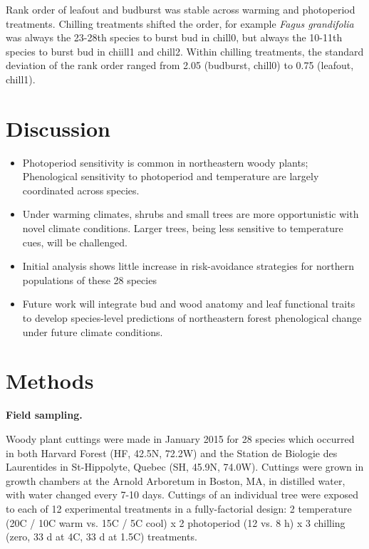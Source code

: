 \documentclass{article}
\begin{document}
Rank order of leafout and budburst was stable across warming and photoperiod treatments. Chilling treatments shifted the order, for example \emph{Fagus grandifolia} was always the 23-28th species to burst bud in chill0, but always the 10-11th species to burst bud in chiill1 and chill2. Within chilling treatments, the standard deviation of the rank order ranged from 2.05 (budburst, chill0) to 0.75 (leafout, chill1). 

\section*{Discussion}

\begin{itemize}

\item{Photoperiod sensitivity is common in northeastern woody plants; Phenological sensitivity to photoperiod and temperature are largely coordinated across species.}
\item{Under warming climates, shrubs and small trees are more opportunistic with novel climate conditions. Larger trees, being less sensitive to temperature cues, will be challenged. }
\item{Initial analysis shows little increase in risk-avoidance strategies for northern populations of these 28 species}
\item{Future work will integrate bud and wood anatomy and leaf functional traits to develop species-level predictions of northeastern forest phenological change under future climate conditions.}
\end{itemize}

\section*{Methods}

\textbf{Field sampling.}

Woody plant cuttings were made in January 2015 for 28 species which occurred in both Harvard Forest (HF, 42.5\degree N, 72.2\degree W) and the Station de Biologie des Laurentides in St-Hippolyte, Quebec (SH, 45.9\degree N, 74.0\degree W). Cuttings were grown in growth chambers at the Arnold Arboretum in Boston, MA, in distilled water, with water changed every 7-10 days. Cuttings of an individual tree were exposed to each of 12 experimental treatments in a fully-factorial design: 2 temperature (20\degree C / 10\degree C warm vs. 15\degree C / 5\degree C cool) x 2 photoperiod (12 vs. 8 h) x 3 chilling (zero,  33 d at 4\degree C, 33 d at 1.5\degree C) treatments. 
\end{document}
